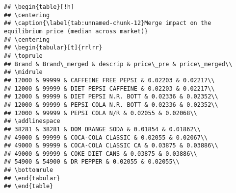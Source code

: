 \documentclass[
]{article}
\begin{document}
\begin{verbatim}
## \begin{table}[!h]
## \centering
## \caption{\label{tab:unnamed-chunk-12}Merge impact on the equilibrium price (median across market)}
## \centering
## \begin{tabular}[t]{rrlrr}
## \toprule
## Brand & Brand\_merged & descrip & price\_pre & price\_merged\\
## \midrule
## 12000 & 99999 & CAFFEINE FREE PEPSI & 0.02203 & 0.02217\\
## 12000 & 99999 & DIET PEPSI CAFFEINE & 0.02203 & 0.02217\\
## 12000 & 99999 & DIET PEPSI N.R. BOTT & 0.02336 & 0.02352\\
## 12000 & 99999 & PEPSI COLA N.R. BOTT & 0.02336 & 0.02352\\
## 12000 & 99999 & PEPSI COLA N/R & 0.02055 & 0.02068\\
## \addlinespace
## 38281 & 38281 & DOM ORANGE SODA & 0.01854 & 0.01862\\
## 49000 & 99999 & COCA-COLA CLASSIC & 0.02055 & 0.02067\\
## 49000 & 99999 & COCA-COLA CLASSIC CA & 0.03875 & 0.03886\\
## 49000 & 99999 & COKE DIET CANS & 0.03875 & 0.03886\\
## 54900 & 54900 & DR PEPPER & 0.02055 & 0.02055\\
## \bottomrule
## \end{tabular}
## \end{table}
\end{verbatim}
\end{document}
